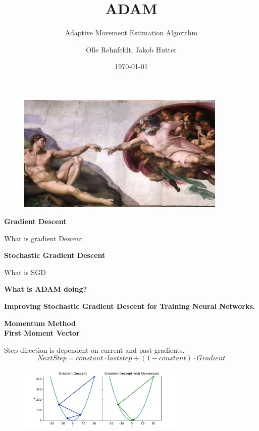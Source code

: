 \documentclass{beamer}
\author{Olle Rehnfeldt, Jakob Hutter}
\title{ADAM}
\subtitle{Adaptive Movement Estimation Algorithm}
\institute{Data Science and Society}
\date{\today}
\newcommand\myheading[1]{%
  \par\bigskip
  {\Large\bfseries#1}\par\smallskip}
\begin{document}
\begin{frame}
    \titlepage
\end{frame}

\begin{frame}
    \begin{figure}[h]
        \includegraphics[width=10cm]{presentation/ADAMS/historical.jpg}
    \end{figure}
\end{frame}

\begin{frame}
    \begin{figure}[h]
    \end{figure}
\end{frame}


\begin{frame}
    \myheading{Gradient Descent}
    What is gradient Descent
\end{frame}


\begin{frame}
    \myheading{Stochastic Gradient Descent}
    What is SGD
\end{frame}

\begin{frame}
    \myheading{What is ADAM doing?}
\end{frame}
\begin{frame}
    \myheading{Improving Stochastic Gradient Descent for Training Neural Networks.}
\end{frame}


\begin{frame}
    \myheading{Momentum Method\\First Moment Vector}
    Step direction is dependent on current and past gradients.
    $$Next Step = constant \cdot last step + (1-constant) \cdot Gradient$$
    
    \begin{figure}[h]
        \includegraphics[width=8cm]{report/figures/GD_momentum.pdf}
    \end{figure}
\end{frame}
\end{document}
